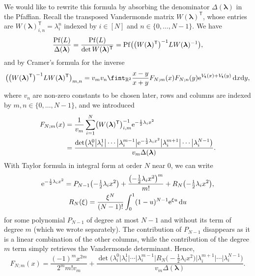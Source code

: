 \documentclass[pdftex]{sigma}
\numberwithin{equation}{section}
\newcommand{\dd}{\mathrm{d}}
\begin{document}
We would like to rewrite this formula by absorbing the denominator $\Delta(\boldsymbol{\lambda})$ in the Pfaffian. Recall the transposed Vandermonde matrix $W(\boldsymbol{\lambda})^{\mathsf T}$, whose entries are $W(\boldsymbol{\lambda})_{i,n}^{\mathsf T} = \lambda_i^{n}$ indexed by $i \in [N]$ and $n \in \{0,\dots,N - 1\}$. We have
\[
\frac{{\rm Pf}(L)}{\Delta(\boldsymbol{\lambda})} = \frac{{\rm Pf}(L)}{\det W(\boldsymbol{\lambda})^{\mathsf T}} = {\rm Pf}\bigl(\bigl(W(\boldsymbol{\lambda})^{\mathsf T}\bigr)^{-1} LW(\boldsymbol{\lambda})^{-1}\bigr),
\]
and by Cramer's formula for the inverse
\[
\bigl(\bigl(W(\boldsymbol{\lambda})^{\mathsf T}\bigr)^{-1} L W(\boldsymbol{\lambda})^{\mathsf T}\bigr)_{m,n} = v_mv_n\fint_{\mathbb{R}^2} \frac{x - y}{x + y} F_{N;m}(x)F_{N;n}(y) {\rm e}^{V_{\mathbf{t}}(x) + V_{\mathbf{t}}(y)}\,\dd x\dd y,
\]
where $v_n$ are non-zero constants to be chosen later, rows and columns are indexed by $m,n \in \{0,\dots,N - 1\}$, and we introduced
\begin{align*}
F_{N;m}(x) &{}= \frac{1}{v_m}\sum_{i = 1}^{N} \bigl(W(\boldsymbol{\lambda})^{\mathsf T}\bigr)^{-1}_{i,m} {\rm e}^{-\frac{1}{2}\lambda_i x^2} \\
&{}= \frac{\det\bigl(\lambda_i^0 \big| \lambda_i^1  \big| \cdots \big| \lambda_i^{m - 1} \big| {\rm e}^{-\frac{1}{2}\lambda_i x^2} \big| \lambda_i^{m + 1} \big| \cdots \big| \lambda_i^{N - 1}\bigr)}{v_m \Delta(\boldsymbol{\lambda})}.
\end{align*}
With Taylor formula in integral form at order $N$ near $0$, we can write
\begin{gather*}
{\rm e}^{-\frac{1}{2}\lambda_ix^2} = P_{N - 1}\bigl(-\tfrac{1}{2}\lambda_ix^2\bigr) + \frac{\bigl(-\frac{1}{2}\lambda_i x^2\bigr)^m}{m!} + R_{N}\bigl(-\tfrac{1}{2}\lambda_i x^2\bigr), \\
R_N(\xi) = \frac{\xi^{N}}{(N - 1)!} \int_{0}^{1}(1-u)^{N - 1} {\rm e}^{\xi u}\, \dd u
\end{gather*}
for some polynomial $P_{N - 1}$ of degree at most $N - 1$ and without its term of degree $m$ (which we wrote separately). The contribution of $P_{N - 1}$ disappears as it is a linear combination of the other columns, while the contribution of the degree $m$ term simply retrieves the Vandermonde determinant. Hence,
\[
F_{N;m}(x) = \frac{(-1)^mx^{2m}}{2^m m! v_m} + \frac{\det\bigl(\lambda_i^0  \big| \lambda_i^1  \big| \cdots \big| \lambda_i^{m - 1} \big| R_N\bigl(-\tfrac{1}{2}\lambda_ix^2\bigr) \big| \lambda_i^{m + 1} \big| \cdots \big| \lambda_i^{N - 1}\bigr)}{v_m \Delta(\boldsymbol{\lambda})}.
\]
\end{document}

